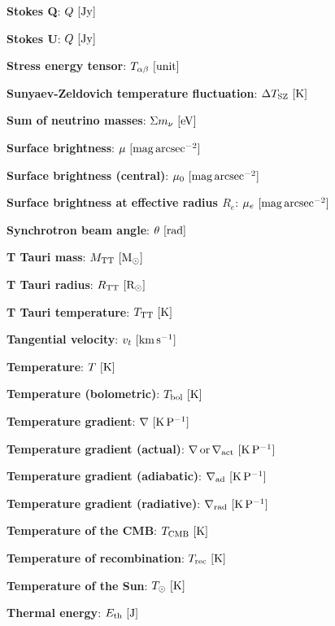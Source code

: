 \documentclass[a4paper,10pt]{article}
\begin{document}
{\noindent}\textbf{Stokes Q}: $Q ~ [{\rm Jy}]$

{\noindent}\textbf{Stokes U}: $Q ~ [{\rm Jy}]$

{\noindent}\textbf{Stress energy tensor}: $T_{\alpha\beta} ~ [{\rm unit}]$

{\noindent}\textbf{Sunyaev-Zeldovich temperature fluctuation}: $\Delta T_\mathrm{SZ} ~ [{\rm K}]$

{\noindent}\textbf{Sum of neutrino masses}: $\Sigma m_\nu ~ [{\rm eV}]$

{\noindent}\textbf{Surface brightness}: $\mu ~ [{\rm mag\,arcsec^{-2}}]$

{\noindent}\textbf{Surface brightness (central)}: $\mu_0 ~ [{\rm mag\,arcsec^{-2}}]$

{\noindent}\textbf{Surface brightness at effective radius $R_e$}: $\mu_e ~ [{\rm mag\,arcsec^{-2}}]$

{\noindent}\textbf{Synchrotron beam angle}: $\theta ~ [{\rm rad}]$

{\noindent}\textbf{T Tauri mass}: $M_{\rm TT} ~ [{\rm M_\odot}]$

{\noindent}\textbf{T Tauri radius}: $R_{\rm TT} ~ [{\rm R_\odot}]$

{\noindent}\textbf{T Tauri temperature}: $T_{\rm TT} ~ [{\rm K}]$

{\noindent}\textbf{Tangential velocity}: $v_t ~ [{\rm km\,s^{-1}}]$

{\noindent}\textbf{Temperature}: $T ~ [{\rm K}]$

{\noindent}\textbf{Temperature (bolometric)}: $T_{\rm bol} ~ [{\rm K}]$

{\noindent}\textbf{Temperature gradient}: $\nabla ~ [{\rm K\,P^{-1}}]$

{\noindent}\textbf{Temperature gradient (actual)}: $\nabla\,{\rm or}\,\nabla_{\rm act} ~ [{\rm K\,P^{-1}}]$

{\noindent}\textbf{Temperature gradient (adiabatic)}: $\nabla_{\rm ad} ~ [{\rm K\,P^{-1}}]$

{\noindent}\textbf{Temperature gradient (radiative)}: $\nabla_{\rm rad} ~ [{\rm K\,P^{-1}}]$

{\noindent}\textbf{Temperature of the CMB}: $T_{\rm CMB} ~ [{\rm K}]$

{\noindent}\textbf{Temperature of recombination}: $T_{\rm rec} ~ [{\rm K}]$

{\noindent}\textbf{Temperature of the Sun}: $T_\odot ~ [{\rm K}]$

{\noindent}\textbf{Thermal energy}: $E_\mathrm{th} ~ [{\rm J}]$
\end{document}
